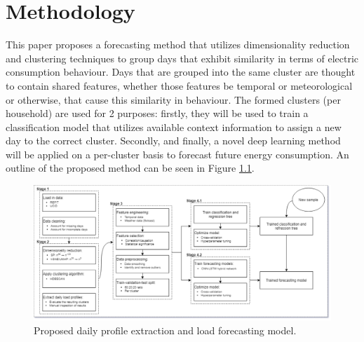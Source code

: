 \chapter{Methodology}
\label{ch:Methodology}
This paper proposes a forecasting method that utilizes dimensionality reduction and clustering techniques to group days that exhibit similarity in terms of electric consumption behaviour. Days that are grouped into the same cluster are thought to contain shared features, whether those features be temporal or meteorological or otherwise, that cause this similarity in behaviour. The formed clusters (per household) are used for 2 purposes: firstly, they will be used to train a classification model that utilizes available context information to assign a new day to the correct cluster. Secondly, and finally, a novel deep learning method will be applied on a per-cluster basis to forecast future energy consumption. An outline of the proposed method can be seen in Figure \ref{fig:Proposed-Model}.

\begin{figure}[H]
    \begin{adjustwidth}{-3.0cm}{-3.0cm}%
        \centering
        \includegraphics[width=\linewidth]{Images/Chapter 6/Proposed-Model.pdf}
        \caption{Proposed daily profile extraction and load forecasting model.}
        \label{fig:Proposed-Model}
    \end{adjustwidth}
\end{figure}

